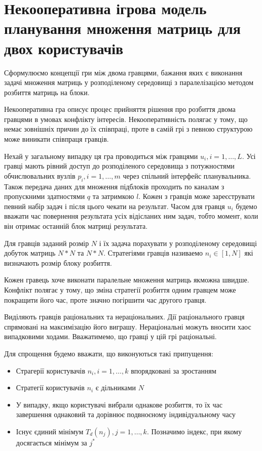 \section{Некооперативна ігрова модель планування множення матриць для двох користувачів}

Сформулюємо концепції гри між двома гравцями, бажання яких є виконання задачі множення матриць у розподіленому середовищі з паралелізацією методом розбиття матриць на блоки. 

Некооперативна гра описує процес прийняття рішення про розбиття двома гравцями в умовах конфлікту інтересів. Некооперативність полягає у тому, що немає зовнішніх причин до їх співпраці, проте в самій грі з певною структурою може виникати співпраця гравців.

Нехай у загальному випадку ця гра проводиться між гравцями ${u_i}, i=1,\ldots,L$. Усі гравці мають рівний доступ до розподіленого середовища з потужностями обчислювальних вузлів ${p_i}, i=1,\ldots,m$ через спільний інтерфейс планувальника. Також передача даних для множення підблоків проходить по каналам з пропускними здатностями $q$ та затримкою $l$. Кожен з гравців може зареєструвати певний набір задач і після цього чекати на результат. Часом для гравця $u_i$ будемо вважати час повернення результата усіх відісланих ним задач, тобто момент, коли він отримає останній блок матриці результата.

Для гравців заданий розмір $N$ і їх задача порахувати у розподіленому середовищі добуток матриць $N*N$ та $N*N$. Стратегіями гравців називаемо $n_i \in [1,N]$ які визначають розмір блоку розбиття.

Кожен гравець хоче виконати паралельне множення матриць якможна швидше. Конфлікт полягає у тому, що зміна стратегії розбиття одним гравцем може покращити його час, проте значно погіршити час другого гравця.

Виділяють гравців раціональних та нераціональних. Дії раціонального гравця спрямовані на максимізацію його виграшу. Нераціональні можуть вносити хаос випадковими ходами. Вважатимемо, що гравці у цій грі раціональні.

Для спрощення будемо вважати, що виконуються такі припущення:
\begin{itemize}
	\item Страгерії користувачів $n_i, i=1,\ldots,k$ впорядковані за зростанням
	\item Стратегії користувачів $n_i$ є дільниками $N$
	\item У випадку, якщо користувачі вибрали однакове розбиття, то їх час завершення однаковий та дорівнює подвноєному індивідуальному часу
	\item Існує єдиний мінімум $T_d(n_j), j=1,\ldots,k$. Позначимо індекс, при якому досягається мінімум за $j^*$
\end{itemize}



 